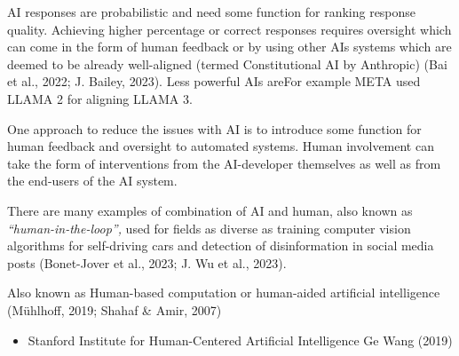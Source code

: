 \documentclass[
  letterpaper,
  DIV=11,
  numbers=noendperiod]{scrartcl}
\providecommand{\tightlist}{%
  \setlength{\itemsep}{0pt}\setlength{\parskip}{0pt}}\usepackage{longtable,booktabs,array}
\begin{document}
AI responses are probabilistic and need some function for ranking
response quality. Achieving higher percentage or correct responses
requires oversight which can come in the form of human feedback or by
using other AIs systems which are deemed to be already well-aligned
(termed Constitutional AI by Anthropic) (Bai et al., 2022; J. Bailey,
2023). Less powerful AIs areFor example META used LLAMA 2 for aligning
LLAMA 3.

One approach to reduce the issues with AI is to introduce some function
for human feedback and oversight to automated systems. Human involvement
can take the form of interventions from the AI-developer themselves as
well as from the end-users of the AI system.

There are many examples of combination of AI and human, also known as
\emph{``human-in-the-loop'',} used for fields as diverse as training
computer vision algorithms for self-driving cars and detection of
disinformation in social media posts (Bonet-Jover et al., 2023; J. Wu et
al., 2023).

Also known as Human-based computation or human-aided artificial
intelligence (Mühlhoff, 2019; Shahaf \& Amir, 2007)

\begin{itemize}
\tightlist
\item
  Stanford Institute for Human-Centered Artificial Intelligence Ge Wang
  (2019)
\end{itemize}
\end{document}
